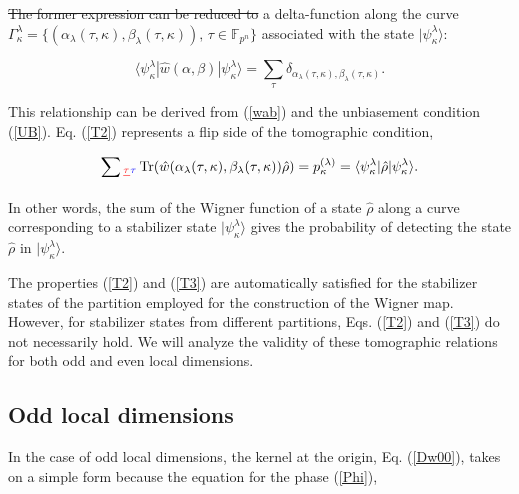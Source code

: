 \documentclass[quantumrep,article,submit,pdftex,moreauthors]{Definitions/mdpi}
\DeclareMathOperator{\Tr}{Tr}
\providecommand{\DIFadd}[1]{{\protect\color{blue}\uwave{#1}}} %
\providecommand{\DIFdel}[1]{{\protect\color{red}\sout{#1}}}                      %
\providecommand{\DIFaddbegin}{} %
\providecommand{\DIFaddend}{} %
\providecommand{\DIFdelbegin}{} %
\providecommand{\DIFdelend}{} %
\begin{document}
\DIFdelbegin \DIFdel{The former expression can be reduced to }\DIFdelend
\DIFaddbegin \DIFadd{which is just }\DIFaddend a delta-function along the curve
$\Gamma_{\kappa}^{\lambda} =
\{(\alpha_{\lambda}(\tau,\kappa),\beta_{\lambda}(\tau,\kappa)),\,\tau \in
\mathbb F_{p^{n}}\}$ associated with the state $|\psi_{\kappa
}^{\lambda}\rangle$:

\begin{equation}
  \langle \psi_{\kappa}^{\lambda}
  |\hat{w}\left( \alpha,\beta \right)
  |\psi_{\kappa }^{\lambda}
  \rangle = \sum_{\tau} \delta_{\alpha_{\lambda}(\tau,\kappa),
  \beta_{\lambda}(\tau ,\kappa )}.
  \label{T2}
\end{equation}

This relationship can be derived from (\ref{wab}) and the unbiasement condition
(\ref{UB}). Eq. (\ref{T2}) represents a flip side of the tomographic condition,

\begin{equation}
  \sum\DIFdelbegin \DIFdel{_{\tau } }\DIFdelend \DIFaddbegin \DIFadd{_{\tau} }\DIFaddend \Tr\left(
    \hat{w}\left(
      \alpha_{\lambda}(\tau,\kappa),\beta_{\lambda}(\tau,\kappa)
    \right) \hat{\rho}
  \right)
  = p_{\kappa}^{(\lambda)}
  = \langle \psi_{\kappa}^{\lambda} |\hat{\rho}|\psi_{\kappa}^{\lambda}\rangle.
  \label{T3}
\end{equation}

In other words, the sum of the Wigner function of a state $\hat{\rho}$ along a
curve corresponding to a stabilizer state $|\psi_{\kappa}^{\lambda}\rangle$
gives the probability of detecting the state $\hat{\rho}$ in
$|\psi_{\kappa}^{\lambda}\rangle$.

The properties (\ref{T2}) and (\ref{T3}) are automatically satisfied for the
stabilizer states of the partition employed for the construction of the Wigner
map. However, for stabilizer states from different partitions, Eqs. (\ref{T2})
and (\ref{T3}) do not necessarily hold. We will analyze the validity of these
tomographic relations for both odd and even local dimensions.

\subsection{Odd local dimensions}

In the case of odd local dimensions, the kernel at the origin, Eq. (\ref{Dw00}),
takes on a simple form because the equation for the phase (\ref{Phi}), 

\DIFaddbegin 
\end{document}

